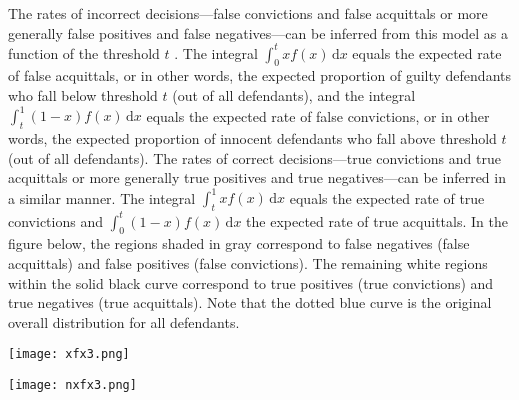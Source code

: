 \documentclass{article}
\begin{document}
The rates of incorrect decisions---false convictions and false acquittals or more generally false positives and false negatives---can be inferred from this model as a function of the threshold $t$ \citep{hamer2004, hamer2014}. The integral $\int_0^t \! xf(x) \, \mathrm{d}x$ equals the expected rate of false acquittals, or in other words, the expected proportion of guilty defendants who fall below threshold $t$ (out of all  defendants), and the  integral $\int_t^1 \! (1-x)f(x) \, \mathrm{d}x$ equals the expected rate of false convictions, or in other words, the expected proportion of innocent defendants who fall above threshold $t$ (out of all defendants).
The rates of correct decisions---true convictions and true acquittals or more generally true positives and true negatives---can be inferred in a similar manner. The integral $\int_t^1 \! xf(x) \, \mathrm{d}x$ equals the expected rate of true convictions and $\int_0^t \! (1-x)f(x) \, \mathrm{d}x$ the expected rate of true acquittals. In the figure below, the regions shaded in gray correspond to false negatives (false acquittals) and false positives (false convictions).
The remaining white regions within the solid black curve correspond to true positives (true convictions) and true negatives (true acquittals). Note that the dotted blue curve is the original overall distribution for all defendants. 




 \begin{center}
    \texttt{[image: xfx3.png]}
\end{center}



\begin{center}
    \texttt{[image: nxfx3.png]}
\end{center}





 
 
\end{document}
